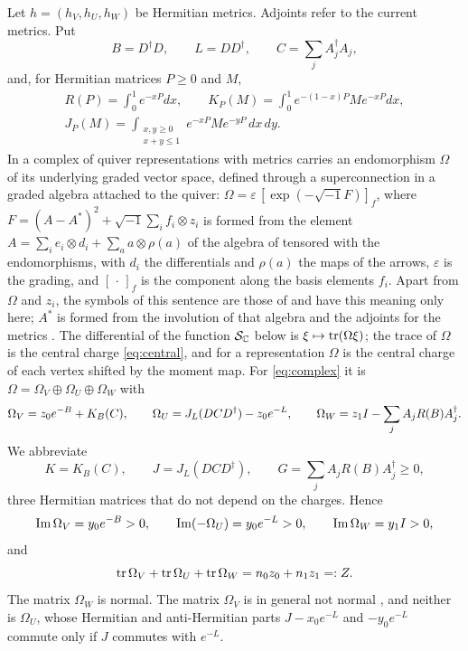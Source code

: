 Let $h=(h_V,h_U,h_W)$ be Hermitian metrics. Adjoints refer to the current
metrics. Put
\[
 B=D^\dagger D,\qquad L=DD^\dagger,\qquad C=\sum_jA_j^\dagger A_j,
\]
and, for Hermitian matrices $P\geq0$ and $M$,
\begin{equation}\label{eq:J}
 \begin{gathered}
 R(P)=\int_0^1e^{-xP}dx,\qquad
 K_P(M)=\int_0^1e^{-(1-x)P}Me^{-xP}dx,\\
 J_P(M)=\int_{\substack{x,y\geq0\\x+y\leq1}}e^{-xP}Me^{-yP}\,dx\,dy .
 \end{gathered}
\end{equation}
In \cite[\S5.4]{hkkp26} a complex of quiver representations with metrics
carries an endomorphism $\Omega$ of its underlying graded vector space,
defined through a superconnection in a graded algebra attached to the
quiver: $\Omega=\varepsilon\,[\exp(-\sqrt{-1}F)]_f$, where
$F=(A-A^*)^2+\sqrt{-1}\sum_if_i\otimes z_i$ is formed from the element
$A=\sum_ie_i\otimes d_i+\sum_aa\otimes\rho(a)$ of the algebra of
\cite[Definition~5.13]{hkkp26} tensored with the endomorphisms, with $d_i$
the differentials and $\rho(a)$ the maps of the arrows, $\varepsilon$ is the
grading, and $[\,\cdot\,]_f$ is the component along the basis elements
$f_i$. Apart from $\Omega$ and $z_i$, the symbols of this sentence are those
of \cite{hkkp26} and have this meaning only here; $A^*$ is formed from the
involution of that algebra and the adjoints for the metrics
\cite[(5.14)]{hkkp26}. The
differential of the function $\mathcal S_{\mathbb C}$ below is
$\xi\mapsto\operatorname{tr}(\Omega\xi)$; the trace of $\Omega$ is the central charge
\eqref{eq:central}, and for a representation $\Omega$ is the central charge
of each vertex shifted by the moment map. For \eqref{eq:complex} it is
$\Omega=\Omega_V\oplus\Omega_U\oplus\Omega_W$ with
\cite[Proposition~2.1]{wue26}
\begin{equation}\label{eq:coeff}
 \Omega_V=z_0e^{-B}+K_B(C),\qquad
 \Omega_U=J_L(DCD^\dagger)-z_0e^{-L},\qquad
 \Omega_W=z_1I-\sum_jA_jR(B)A_j^\dagger .
\end{equation}
We abbreviate
\begin{equation}\label{eq:KJG}
 K=K_B(C),\qquad J=J_L(DCD^\dagger),\qquad G=\sum_jA_jR(B)A_j^\dagger\geq0 ,
\end{equation}
three Hermitian matrices that do not depend on the charges. Hence
\begin{equation}\label{eq:imaginary}
 \operatorname{Im}\Omega_V=y_0e^{-B}>0,\qquad
 \operatorname{Im}(-\Omega_U)=y_0e^{-L}>0,\qquad
 \operatorname{Im}\Omega_W=y_1I>0,
\end{equation}
and \cite[Lemma~5.17]{hkkp26}
\begin{equation}\label{eq:central}
 \operatorname{tr}\Omega_V+\operatorname{tr}\Omega_U+\operatorname{tr}\Omega_W=n_0z_0+n_1z_1=:Z .
\end{equation}
The matrix $\Omega_W$ is normal. The matrix $\Omega_V$ is in general not
normal \cite[Example~2.3]{wue26}, and neither is $\Omega_U$, whose Hermitian
and anti-Hermitian parts $J-x_0e^{-L}$ and $-y_0e^{-L}$ commute only if $J$
commutes with $e^{-L}$.

